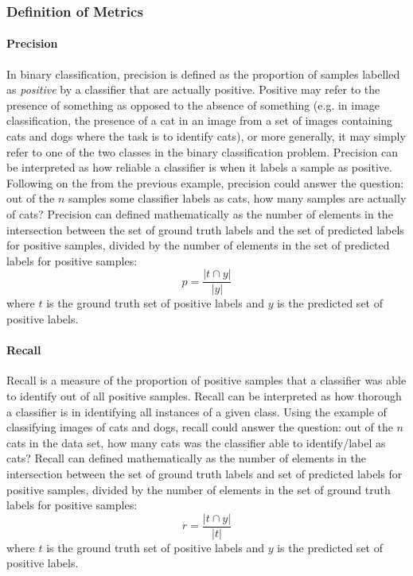 \documentclass[12pt]{article}
\theoremstyle{grammarstyle}
\begin{document}
\subsubsection{Definition of Metrics}
\paragraph{Precision} In binary classification, precision is defined as the proportion of samples labelled as \textit{positive} by a classifier that are actually positive.
Positive may refer to the presence of something as opposed to the absence of something (e.g. in image classification, the presence of a cat in an image from a set of images containing cats and dogs where the task is to identify cats), or more generally, it may simply refer to one of the two classes in the binary classification problem.
Precision can be interpreted as how reliable a classifier is when it labels a sample as positive.
Following on the from the previous example, precision could answer the question: out of the $n$ samples some classifier labels as cats, how many samples are actually of cats? Precision can defined mathematically as the number of elements in the intersection between the set of ground truth labels and the set of predicted labels for positive samples, divided by the number of elements in the set of predicted labels for positive samples:
\begin{equation*}
    p = \frac{|t \cap y|}{|y|}
\end{equation*}
where $t$ is the ground truth set of positive labels and $y$ is the predicted set of positive labels.

\paragraph{Recall} Recall is a measure of the proportion of positive samples that a classifier was able to identify out of all positive samples. Recall can be interpreted as how thorough a classifier is in identifying all instances of a given class. Using the example of classifying images of cats and dogs, recall could answer the question: out of the $n$ cats in the data set, how many cats was the classifier able to identify/label as cats? Recall can defined mathematically as the number of elements in the intersection between the set of ground truth labels and set of predicted labels for positive samples, divided by the number of elements in the set of ground truth labels for positive samples:
\begin{equation*}
    r = \frac{|t \cap y|}{|t|}
\end{equation*}
where $t$ is the ground truth set of positive labels and $y$ is the predicted set of positive labels.
\end{document}
